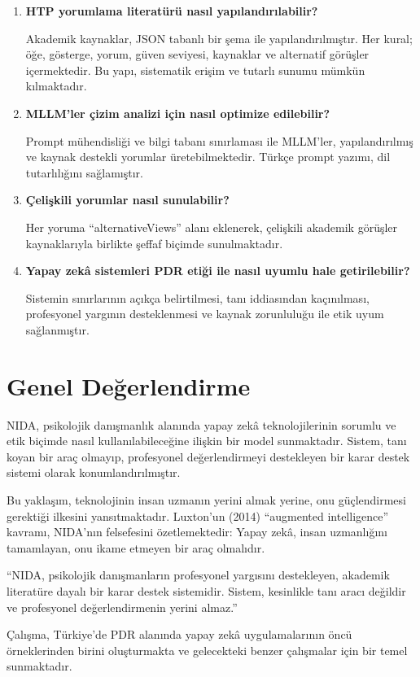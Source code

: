 \begin{enumerate}
  \item \textbf{HTP yorumlama literatürü nasıl yapılandırılabilir?}

  Akademik kaynaklar, JSON tabanlı bir şema ile yapılandırılmıştır. Her kural; öğe, gösterge, yorum, güven seviyesi, kaynaklar ve alternatif görüşler içermektedir. Bu yapı, sistematik erişim ve tutarlı sunumu mümkün kılmaktadır.

  \item \textbf{MLLM'ler çizim analizi için nasıl optimize edilebilir?}

  Prompt mühendisliği ve bilgi tabanı sınırlaması ile MLLM'ler, yapılandırılmış ve kaynak destekli yorumlar üretebilmektedir. Türkçe prompt yazımı, dil tutarlılığını sağlamıştır.

  \item \textbf{Çelişkili yorumlar nasıl sunulabilir?}

  Her yoruma ``alternativeViews'' alanı eklenerek, çelişkili akademik görüşler kaynaklarıyla birlikte şeffaf biçimde sunulmaktadır.

  \item \textbf{Yapay zekâ sistemleri PDR etiği ile nasıl uyumlu hale getirilebilir?}

  Sistemin sınırlarının açıkça belirtilmesi, tanı iddiasından kaçınılması, profesyonel yargının desteklenmesi ve kaynak zorunluluğu ile etik uyum sağlanmıştır.
\end{enumerate}

\section{Genel Değerlendirme}

NIDA, psikolojik danışmanlık alanında yapay zekâ teknolojilerinin sorumlu ve etik biçimde nasıl kullanılabileceğine ilişkin bir model sunmaktadır. Sistem, tanı koyan bir araç olmayıp, profesyonel değerlendirmeyi destekleyen bir karar destek sistemi olarak konumlandırılmıştır.

Bu yaklaşım, teknolojinin insan uzmanın yerini almak yerine, onu güçlendirmesi gerektiği ilkesini yansıtmaktadır. Luxton'un (2014) ``augmented intelligence'' kavramı, NIDA'nın felsefesini özetlemektedir: Yapay zekâ, insan uzmanlığını tamamlayan, onu ikame etmeyen bir araç olmalıdır.

\begin{quotebox}
``NIDA, psikolojik danışmanların profesyonel yargısını destekleyen, akademik literatüre dayalı bir karar destek sistemidir. Sistem, kesinlikle tanı aracı değildir ve profesyonel değerlendirmenin yerini almaz.''
\end{quotebox}

Çalışma, Türkiye'de PDR alanında yapay zekâ uygulamalarının öncü örneklerinden birini oluşturmakta ve gelecekteki benzer çalışmalar için bir temel sunmaktadır.

\newpage
